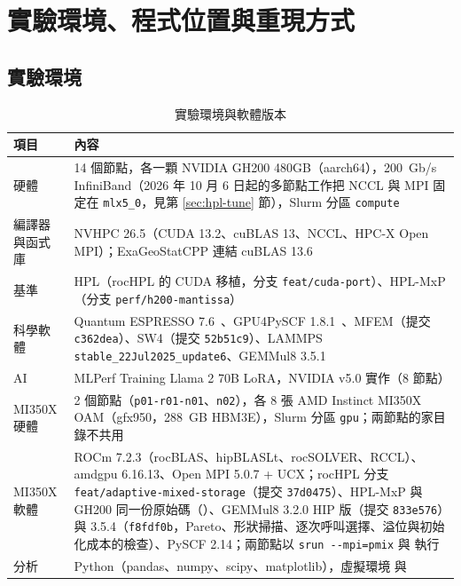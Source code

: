 \chapter{實驗環境、程式位置與重現方式}\label{app:repro-ch}

\section{實驗環境}\label{app:env}

\begin{table}[htbp]
\centering
\caption{實驗環境與軟體版本}\label{tab:env}
\small
\begin{tabularx}{\textwidth}{@{}>{\raggedright\arraybackslash}p{2.6cm}L@{}}
\toprule
項目 & 內容 \\
\midrule
硬體 & 14 個節點，各一顆 NVIDIA GH200 480GB（aarch64），200~Gb/s InfiniBand（2026 年 10 月 6 日起的多節點工作把 NCCL 與 MPI 固定在 \texttt{mlx5\_0}，見第 \ref{sec:hpl-tune} 節），Slurm 分區 \texttt{compute} \\
編譯器與函式庫 & NVHPC 26.5（CUDA 13.2、cuBLAS 13、NCCL、HPC-X Open MPI）；ExaGeoStatCPP 連結 cuBLAS 13.6 \\
基準 & HPL（rocHPL 的 CUDA 移植，分支 \texttt{feat/cuda-port}）、HPL-MxP（分支 \texttt{perf/h200-mantissa}）~\cite{Dongarra2025} \\
科學軟體 & Quantum ESPRESSO 7.6~\cite{Giannozzi2020}、GPU4PySCF 1.8.1~\cite{Wu2025,Li2025}、MFEM（提交 \texttt{c362dea}）、SW4（提交 \texttt{52b51c9}）、LAMMPS \texttt{stable\_22Jul2025\_update6}、GEMMul8 3.5.1 \\
AI & MLPerf Training Llama 2 70B LoRA，NVIDIA v5.0 實作（8 節點） \\
MI350X 硬體 & 2 個節點（\texttt{p01-r01-n01}、\texttt{n02}），各 8 張 AMD Instinct MI350X OAM（gfx950，288~GB HBM3E），Slurm 分區 \texttt{gpu}；兩節點的家目錄不共用 \\
MI350X 軟體 & ROCm 7.2.3（rocBLAS、hipBLASLt、rocSOLVER、RCCL）、amdgpu 6.16.13、Open MPI 5.0.7 + UCX；rocHPL 分支 \texttt{feat/adaptive-mixed-storage}（提交 \texttt{37d0475}）、HPL-MxP 與 GH200 同一份原始碼（）、GEMMul8 3.2.0 HIP 版（提交 \texttt{833e576}）與 3.5.4（\texttt{f8fdf0b}，Pareto、形狀掃描、逐次呼叫選擇、溢位與初始化成本的檢查）、PySCF 2.14；兩節點以 \texttt{srun -{}-mpi=pmix} 與  執行 \\
分析 & Python（pandas、numpy、scipy、matplotlib），虛擬環境  與  \\
\bottomrule
\end{tabularx}
\end{table}

